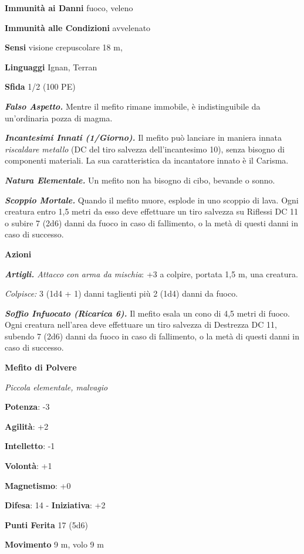 \begin{multicols}{2}
\textbf{Immunità ai Danni} fuoco, veleno

\textbf{Immunità alle Condizioni} avvelenato

\textbf{Sensi} visione crepuscolare 18 m, 

\textbf{Linguaggi} Ignan, Terran

\textbf{Sfida} 1/2 (100 PE)

\emph{\textbf{Falso Aspetto.}} Mentre il mefito rimane immobile, è
indistinguibile da un'ordinaria pozza di magma.

\emph{\textbf{Incantesimi Innati (1/Giorno).}} Il mefito può lanciare in
maniera innata \emph{riscaldare metallo} (DC del tiro salvezza
dell'incantesimo 10), senza bisogno di componenti materiali. La sua
caratteristica da incantatore innato è il Carisma.

\emph{\textbf{Natura Elementale.}} Un mefito non ha bisogno di cibo,
bevande o sonno.

\emph{\textbf{Scoppio Mortale.}} Quando il mefito muore, esplode in uno
scoppio di lava. Ogni creatura entro 1,5 metri da esso deve effettuare
un tiro salvezza su Riflessi DC 11 o subire 7 (2d6) danni da fuoco in
caso di fallimento, o la metà di questi danni in caso di successo.

\textbf{Azioni}

\emph{\textbf{Artigli.} Attacco con arma da mischia}: +3 a colpire,
portata 1,5 m, una creatura.

\emph{Colpisce:} 3 (1d4 + 1) danni taglienti più 2 (1d4) danni da fuoco.

\emph{\textbf{Soffio Infuocato (Ricarica 6).}} Il mefito esala un cono
di 4,5 metri di fuoco. Ogni creatura nell'area deve effettuare un tiro
salvezza di Destrezza DC 11, subendo 7 (2d6) danni da fuoco in caso di
fallimento, o la metà di questi danni in caso di successo.



\textbf{Mefito di Polvere}

\emph{Piccola elementale, malvagio}

\textbf{Potenza}: -3

\textbf{Agilità}: +2

\textbf{Intelletto}: -1

\textbf{Volontà}: +1

\textbf{Magnetismo}: +0

\textbf{Difesa}: 14 - \textbf{Iniziativa}: +2

\textbf{Punti Ferita} 17 (5d6)

\textbf{Movimento} 9 m, volo 9 m


\end{multicols}
